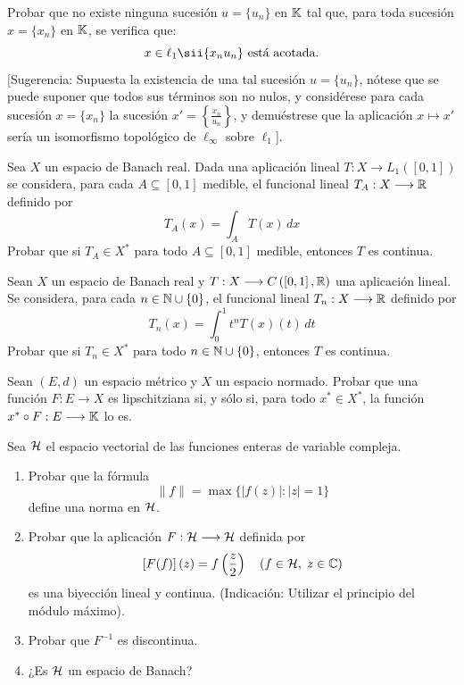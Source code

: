 \begin{ejercicio}
Probar que no existe ninguna sucesión $u = \{u_n\}$ en $\mathbb{K}$ tal que, para toda sucesión $x = \{x_n\}$ en $\mathbb{K}$, se verifica que:
\[
x \in \ell_1 \sii \{x_n u_n\} \text{ está acotada.}
\]
[Sugerencia: Supuesta la existencia de una tal sucesión $u = \{u_n\}$, nótese que se puede suponer que todos sus términos son no nulos, y considérese para cada sucesión $x = \{x_n\}$ la sucesión $x' = \left\{\frac{x_n}{u_n}\right\}$, y demuéstrese que la aplicación $x \mapsto x'$ sería un isomorfismo topológico de $\ell_\infty$ sobre $\ell_1$].
\end{ejercicio}

\begin{ejercicio}
Sea $X$ un espacio de Banach real. Dada una aplicación lineal $T: X \longrightarrow L_1\left(\left[0, 1\right]\right)$ se considera, para cada $A \subseteq \left[0, 1\right]$ medible, el funcional lineal $T_A: X \longrightarrow \mathbb{R}$ definido por
\[
T_A(x) = \int_A T(x)\,dx
\]
Probar que si $T_A \in X^*$ para todo $A \subseteq \left[0, 1\right]$ medible, entonces $T$ es continua.
\end{ejercicio}

\begin{ejercicio}
Sean $X$ un espacio de Banach real y $T: X \longrightarrow C\left(\left[0, 1\right], \mathbb{R}\right)$ una aplicación lineal. Se considera, para cada $n \in \mathbb{N} \cup \{0\}$, el funcional lineal $T_n: X \longrightarrow \mathbb{R}$ definido por
\[
T_n(x) = \int_{0}^1 t^n T(x)(t)\,dt
\]
Probar que si $T_n \in X^*$ para todo $n \in \mathbb{N} \cup \{0\}$, entonces $T$ es continua.
\end{ejercicio}

\begin{ejercicio}
Sean $(E, d)$ un espacio métrico y $X$ un espacio normado. Probar que una función $F: E \longrightarrow X$ es lipschitziana si, y sólo si, para todo $x^* \in X^*$, la función $x^* \circ F: E \longrightarrow \mathbb{K}$ lo es.
\end{ejercicio}

\begin{ejercicio}
Sea $\mathcal{H}$ el espacio vectorial de las funciones enteras de variable compleja.
\begin{enumerate}[label=\textbf{\alph*)}]
    \item Probar que la fórmula
    \[
    \|f\| = \max\{|f(z)| : |z| = 1\}
    \]
    define una norma en $\mathcal{H}$.
    \item Probar que la aplicación $F: \mathcal{H} \longrightarrow \mathcal{H}$ definida por
    \[
    \left[F(f)\right](z) = f\left(\frac{z}{2}\right) \quad (f \in \mathcal{H}, \; z \in \mathbb{C})
    \]
    es una biyección lineal y continua. (Indicación: Utilizar el principio del módulo máximo).
    \item Probar que $F^{-1}$ es discontinua.
    \item ¿Es $\mathcal{H}$ un espacio de Banach?
\end{enumerate}
\end{ejercicio}
